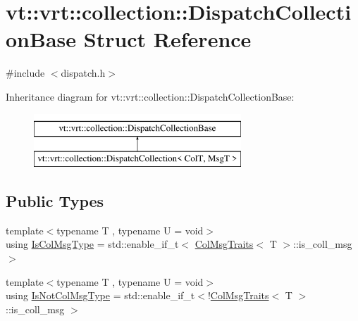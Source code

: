 \hypertarget{structvt_1_1vrt_1_1collection_1_1_dispatch_collection_base}{}\section{vt\+:\+:vrt\+:\+:collection\+:\+:Dispatch\+Collection\+Base Struct Reference}
\label{structvt_1_1vrt_1_1collection_1_1_dispatch_collection_base}


{\ttfamily \#include $<$dispatch.\+h$>$}

Inheritance diagram for vt\+:\+:vrt\+:\+:collection\+:\+:Dispatch\+Collection\+Base\+:\begin{figure}[H]
\begin{center}
\leavevmode
\includegraphics[height=2.000000cm]{structvt_1_1vrt_1_1collection_1_1_dispatch_collection_base}
\end{center}
\end{figure}
\subsection*{Public Types}
\begin{DoxyCompactItemize}
\item 
{\footnotesize template$<$typename T , typename U  = void$>$ }\\using \hyperlink{structvt_1_1vrt_1_1collection_1_1_dispatch_collection_base_a637f8dbdc7970f9991e98e43ff4cf2fe}{Is\+Col\+Msg\+Type} = std\+::enable\+\_\+if\+\_\+t$<$ \hyperlink{structvt_1_1vrt_1_1collection_1_1_col_msg_traits}{Col\+Msg\+Traits}$<$ T $>$\+::is\+\_\+coll\+\_\+msg $>$
\item 
{\footnotesize template$<$typename T , typename U  = void$>$ }\\using \hyperlink{structvt_1_1vrt_1_1collection_1_1_dispatch_collection_base_a0e06b294a83d7d0420614237a2db9814}{Is\+Not\+Col\+Msg\+Type} = std\+::enable\+\_\+if\+\_\+t$<$!\hyperlink{structvt_1_1vrt_1_1collection_1_1_col_msg_traits}{Col\+Msg\+Traits}$<$ T $>$\+::is\+\_\+coll\+\_\+msg $>$
\end{DoxyCompactItemize}
